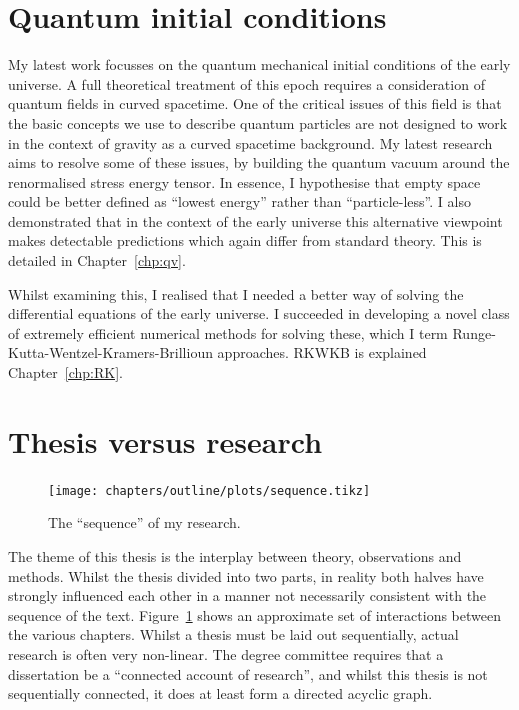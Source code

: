 \section{Quantum initial conditions}
My latest work focusses on the quantum mechanical initial conditions of the early universe. A full theoretical treatment of this epoch requires a consideration of quantum fields in curved spacetime. One of the critical issues of this field is that the basic concepts we use to describe quantum particles are not designed to work in the context of gravity as a curved spacetime background. My latest research aims to resolve some of these issues, by building the quantum vacuum around the renormalised stress energy tensor. In essence, I hypothesise that empty space could be better defined as ``lowest energy'' rather than ``particle-less''. I also demonstrated that in the context of the early universe this alternative viewpoint makes detectable predictions which again differ from standard theory. This is detailed in Chapter~\ref{chp:qv}.

Whilst examining this, I realised that I needed a better way of solving the differential equations of the early universe. I succeeded in developing a novel class of extremely efficient numerical methods for solving these, which I term Runge-Kutta-Wentzel-Kramers-Brillioun approaches. RKWKB is explained Chapter~\ref{chp:RK}.

\section{Thesis versus research}
\begin{figure}[tp]
  \centering
  \texttt{[image: chapters/outline/plots/sequence.tikz]}
  \caption{The ``sequence'' of my research.}\label{fig:out:sequence}
\end{figure}

The theme of this thesis is the interplay between theory, observations and methods. Whilst the thesis divided into two parts, in reality both halves have strongly influenced each other in a manner not necessarily consistent with the sequence of the text. Figure~\ref{fig:out:sequence} shows an approximate set of interactions between the various chapters. Whilst a thesis must be laid out sequentially, actual research is often very non-linear. The degree committee requires that a dissertation be a ``connected account of research'', and whilst this thesis is not sequentially connected, it does at least form a directed acyclic graph.
